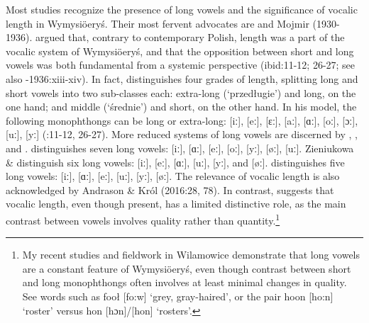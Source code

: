 \documentclass[output=paper]{langscibook}
\begin{document}
Most studies recognize the presence of long vowels and the significance of vocalic length in Wymysiöeryś. Their most fervent advocates are \citet{Kleczkowski1920} and Mojmir (1930-1936). \citet[174]{Kleczkowski1920} argued that, contrary to contemporary Polish, length was a part of the vocalic system of Wymysiöeryś, and that the opposition between short and long vowels was both fundamental from a systemic perspective (ibid:11-12; 26-27; see also \citealt{Mojmir1930}-1936:xiii-xiv). In fact, \citet[26]{Kleczkowski1920} distinguishes four grades of length, splitting long and short vowels into two sub-classes each: extra-long (‘przedługie’) and long, on the one hand; and middle (‘średnie’) and short, on the other hand. In his model, the following monophthongs can be long or extra-long: [iː], [eː], [ɛː], [aː], [ɑː], [oː], [ɔː], [uː], [yː] (\citealt{Kleczkowski1920}:11-12, 26-27). More reduced systems of long vowels are discerned by \citet{Lasatowicz1992}, \citet{ZieniukowaWicherkiewicz2001}, and \citet{Wicherkiewicz2003}. \citet[40-41]{Lasatowicz1992} distinguishes seven long vowels: [iː], [ɑː], [eː], [oː], [yː], [øː], [uː]. Zieniukowa \& \citet[499-500]{Wicherkiewicz2001} distinguish six long vowels: [iː], [eː], [ɑː], [uː], [yː], and [øː]. \citet[405-407]{Wicherkiewicz2003} distinguishes five long vowels: [iː], [ɑː], [eː], [uː], [yː], [øː]. The relevance of vocalic length is also acknowledged by Andrason \& Król (2016:28, 78). In contrast, \citet[1-2]{Weckwerth2015} suggests that vocalic length, even though present, has a limited distinctive role, as the main contrast between vowels involves quality rather than quantity.\footnote{My recent studies and fieldwork in Wilamowice demonstrate that long vowels are a constant feature of Wymysiöeryś, even though contrast between short and long monophthongs often involves at least minimal changes in quality. See words such as fooł [fo:w] ‘grey, gray-haired’, or the pair hoon [ho:n] ‘roster’ versus hon [hɔn]/[hon] ‘rosters’.}
\end{document}
